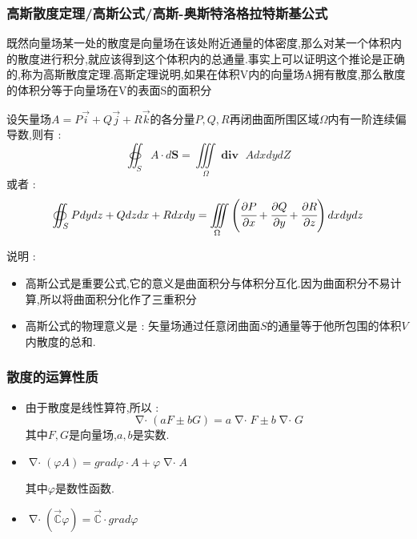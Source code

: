 \documentclass[UTF8,12pt]{ctexbook}
\newcommand{\mathConstant}{\mathbb{C}}
\newcommand{\partialDerivativeFrac}[2]{\cfrac{\partial #1}{\partial #2}}
\newcommand{\tripleIntegralOnZone}[1]{\iiint\limits_{#1}}
\newcommand{\doubleCurveIntegralOnZone}[1]{\oiint_{#1}}
\DeclareMathOperator{\divergenceText}{\mathbf{div}\ }
\DeclareMathOperator{\divergenceSymbol}{\nabla\cdot}
\begin{document}
{{{{    \subsubsection{高斯散度定理/高斯公式/高斯-奥斯特洛格拉特斯基公式}{
      既然向量场某一处的散度是向量场在该处附近通量的体密度,那么对某一个体积内的散度进行积分,就应该得到这个体积内的总通量.事实上可以证明这个推论是正确的,称为高斯散度定理.高斯定理说明,如果在体积V内的向量场A拥有散度,那么散度的体积分等于向量场在V的表面S的面积分

      设矢量场$A = P\vec{i} + Q\vec{j} + R\vec{k}$的各分量$P,Q,R$再闭曲面所围区域$\Omega$内有一阶连续偏导数,则有 :
      $$
        \doubleCurveIntegralOnZone{S}A \cdot d\mathbf{S} = \tripleIntegralOnZone{\Omega}\divergenceText AdxdydZ
      $$
      或者 :
      $$
        \doubleCurveIntegralOnZone{S}Pdydz + Qdzdx + Rdxdy = \tripleIntegralOnZone{\Omega}\left(\partialDerivativeFrac{P}{x} + \partialDerivativeFrac{Q}{y} + \partialDerivativeFrac{R}{z}\right)dxdydz
      $$

      说明 :
      \begin{itemize}
        \item {
              高斯公式是重要公式,它的意义是曲面积分与体积分互化.因为曲面积分不易计算,所以将曲面积分化作了三重积分
              }
        \item {
              高斯公式的物理意义是 : 矢量场通过任意闭曲面$S$的通量等于他所包围的体积$V$内散度的总和.
              }
      \end{itemize}
    }%

    \subsubsection{散度的运算性质}{
      \begin{itemize}
        \item {
              由于散度是线性算符,所以 :
              $$
                \divergenceSymbol(aF \pm bG) = a\divergenceSymbol F \pm b\divergenceSymbol G
              $$
              其中$F,G$是向量场,$a,b$是实数.
              }
        \item {
              $\divergenceSymbol(\varphi A) = grad \varphi \cdot A + \varphi\divergenceSymbol A$

              其中$\varphi$是数性函数.
              }
        \item {
              $\divergenceSymbol (\vec{\mathConstant}\varphi) = \vec{\mathConstant} \cdot grad \varphi$
              }
      \end{itemize}

}}}}}
\end{document}
